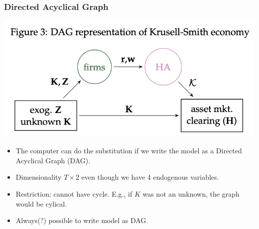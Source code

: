 \documentclass[english,xcolor=svgnames]{beamer}
\begin{document}
\begin{frame}
    \frametitle{Directed Acyclical Graph}
    \begin{center}
    	\includegraphics[scale=0.5]{figures/ABRSFIG3.png}
    \end{center}
    \begin{itemize}
    	\item The computer can do the substitution if we write the model as a Directed Acyclical Graph (DAG).
    	\item Dimensionality $T \times 2$ even though we have 4 endogenous variables.
    	\item Restriction: cannot have cycle. E.g., if $K$ was not an unknown, the graph would be cylical.
        \item Always(?) possible to write model as DAG.
	\end{itemize}
\end{frame}
\end{document}
